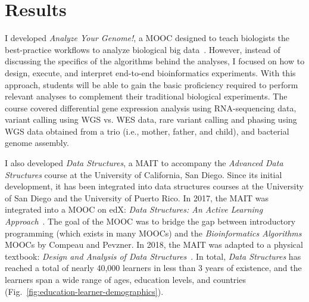 \section{Results}
I developed \textit{Analyze Your Genome!}, a \gls{MOOC} designed to teach biologists the best-practice workflows to analyze biological big data~\cite{Moshiri2017b}. However, instead of discussing the specifics of the algorithms behind the analyses, I focused on how to design, execute, and interpret end-to-end bioinformatics experiments. With this approach, students will be able to gain the basic proficiency required to perform relevant analyses to complement their traditional biological experiments. The course covered differential gene expression analysis using \gls{RNA}-sequencing data, variant calling using \gls{WGS} vs. \gls{WES} data, rare variant calling and phasing using \gls{WGS} data obtained from a trio (i.e., mother, father, and child), and bacterial genome assembly.

I also developed \textit{Data Structures}, a \gls{MAIT} to accompany the \textit{Advanced Data Structures} course at the University of California, San Diego. Since its initial development, it has been integrated into data structures courses at the University of San Diego and the University of Puerto Rico. In 2017, the \gls{MAIT} was integrated into a \gls{MOOC} on edX: \textit{Data Structures: An Active Learning Approach}~\cite{Moshiri2017a}. The goal of the \gls{MOOC} was to bridge the gap between introductory programming (which exists in many \glspl{MOOC}) and the \textit{Bioinformatics Algorithms} \glspl{MOOC} by Compeau and Pevzner. In 2018, the \gls{MAIT} was adapted to a physical textbook: \textit{Design and Analysis of Data Structures}~\cite{Moshiri2018c}. In total, \textit{Data Structures} has reached a total of nearly 40,000 learners in less than 3 years of existence, and the learners span a wide range of ages, education levels, and countries (Fig.~\ref{fig:education-learner-demographics}).

